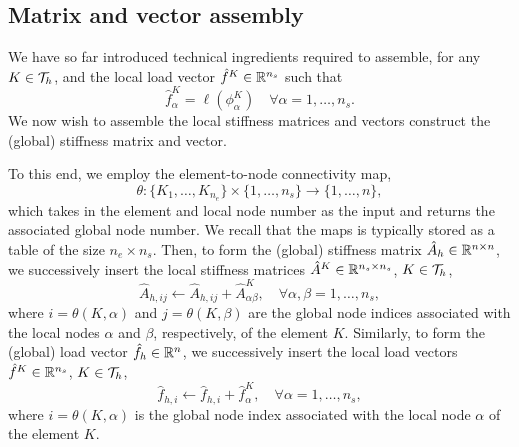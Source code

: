 \subsection{Matrix and vector assembly}

We have so far introduced technical ingredients required to assemble, for any $K \in \mathcal{T}_h$, 
and the local load vector $\hat f^K \in \mathbb{R}^{n_s}$ such that
\begin{equation*}
  \hat f^K_\alpha = \ell(\phi^K_\alpha) \quad \forall \alpha = 1,\dots,n_s.
\end{equation*}
We now wish to assemble the local stiffness matrices and vectors construct the (global) stiffness matrix and vector.

To this end, we employ the element-to-node connectivity map,
\begin{equation*}
  \theta : \{ K_1, \dots, K_{n_e} \} \times \{ 1, \dots, n_s \} \to \{ 1,\dots,n \},
\end{equation*}
which takes in the element and local node number as the input and returns the associated global node number.  We recall that the maps is typically stored as a table of the size $n_e \times n_s$.  Then, to form the (global) stiffness matrix $\hat A_h \in \mathbb{R}^{n \times n}$, we successively insert the local stiffness matrices $\hat A^K \in \mathbb{R}^{n_s \times n_s}$, $K \in \mathcal{T}_h$, 
\begin{equation*}
  \hat A_{h,ij} \leftarrow \hat A_{h,ij} + \hat A^K_{\alpha\beta}, \quad \forall \alpha,\beta = 1,\dots,n_s,
\end{equation*}
where $i = \theta(K,\alpha)$ and $j = \theta(K,\beta)$ are the global node indices associated with the local nodes $\alpha$ and $\beta$, respectively, of the element $K$. Similarly, to form the (global) load vector $\hat f_h \in \mathbb{R}^n$, we successively insert the local load vectors $\hat f^K \in \mathbb{R}^{n_s}$, $K \in \mathcal{T}_h$,
\begin{equation*}
  \hat f_{h,i} \leftarrow \hat f_{h,i} + \hat f^K_{\alpha}, \quad \forall \alpha = 1,\dots,n_s,
\end{equation*}
where $i = \theta(K,\alpha)$ is the global node index associated with the local node $\alpha$ of the element $K$.



